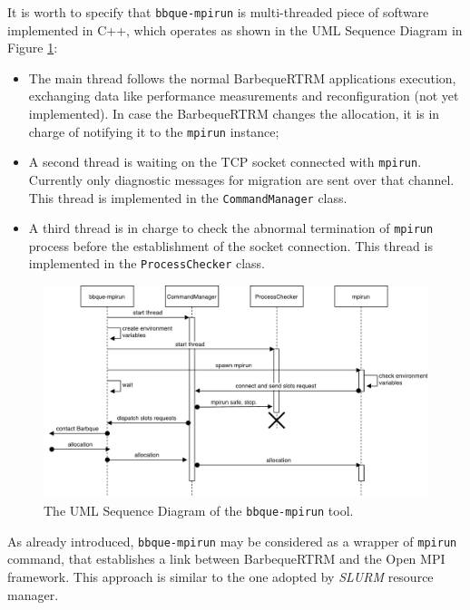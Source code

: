 It is worth to specify that \texttt{bbque-mpirun} is multi-threaded piece
of software implemented in C++, which operates as shown in the UML Sequence Diagram in Figure \ref{fig:cap5-sequencempirun}:
\begin{itemize}
\item The main thread follows the normal BarbequeRTRM applications
      execution, exchanging data like performance measurements and
      reconfiguration (not yet implemented). In case the BarbequeRTRM
      changes the allocation, it is in charge of notifying it to the
      \texttt{mpirun} instance;

\item A second thread is waiting on the TCP socket connected with
      \texttt{mpirun}. Currently only diagnostic messages for migration
      are sent over that channel. This thread is implemented in the
      \texttt{CommandManager} class.

\item A third thread is in charge to check the abnormal termination of
      \texttt{mpirun}
      process before the establishment of the socket connection. This thread
      is implemented in the \texttt{ProcessChecker} class.
\end{itemize}

\begin{figure}[t]
    \centerline 
{\includegraphics[scale=0.5]{img/cap5-sequencempirun.pdf}}
    \caption[UML Sequence Diagram of \texttt{bbque-mpirun}]{The UML Sequence Diagram of the \texttt{bbque-mpirun} tool.}
    \label{fig:cap5-sequencempirun}
\end{figure}

As already introduced, \texttt{bbque-mpirun} may be considered as a wrapper of
\texttt{mpirun} command, that establishes a link between BarbequeRTRM and the
Open MPI framework. This approach is similar to the one adopted by \emph{SLURM}
resource manager.

